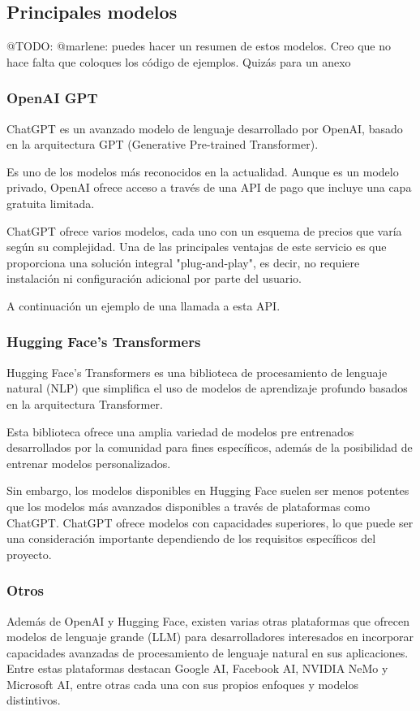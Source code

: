\subsection{Principales modelos}

\colorbox{color_highlight}
{@TODO: @marlene: puedes hacer un resumen de estos modelos. Creo que no hace falta que coloques los código de ejemplos.
Quizás para un anexo}

\subsubsection*{OpenAI GPT}
ChatGPT es un avanzado modelo de lenguaje desarrollado por OpenAI,
basado en la arquitectura GPT (Generative Pre-trained Transformer).

Es uno de los modelos más reconocidos en la actualidad.
Aunque es un modelo privado, OpenAI ofrece acceso a través de una API de pago que incluye una capa gratuita limitada.

ChatGPT ofrece varios modelos, cada uno con un esquema de precios que varía según
su complejidad.
Una de las principales ventajas de este servicio es que proporciona una solución integral "plug-and-play", es decir, no
requiere instalación ni configuración adicional por parte del usuario.

A continuación un ejemplo de una llamada a esta API.


\subsubsection*{Hugging Face's Transformers}
Hugging Face's Transformers
es una biblioteca de procesamiento de lenguaje natural (NLP) que simplifica el uso de modelos de aprendizaje profundo
basados en la arquitectura Transformer.

Esta biblioteca ofrece una amplia variedad de modelos pre entrenados desarrollados por la comunidad
para fines específicos, además de la posibilidad de entrenar modelos personalizados.


Sin embargo, los modelos disponibles en Hugging Face suelen ser menos potentes que los modelos más
avanzados disponibles a través de plataformas como ChatGPT. ChatGPT ofrece
modelos con capacidades superiores, lo que puede ser una
consideración importante dependiendo de los requisitos específicos del proyecto.

\subsubsection*{Otros}
Además de OpenAI y Hugging Face, existen varias otras plataformas que ofrecen modelos de lenguaje
grande (LLM) para desarrolladores interesados en incorporar capacidades
avanzadas de procesamiento de lenguaje natural en sus aplicaciones. Entre
estas plataformas destacan Google AI, Facebook AI, NVIDIA NeMo y Microsoft AI, entre otras cada una con sus propios
enfoques y modelos distintivos.
